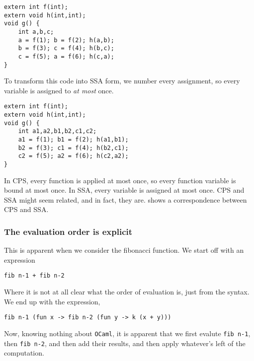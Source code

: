 \begin{code}
\label{code:fib-ocaml-again}
\begin{verbatim}
extern int f(int); 
extern void h(int,int); 
void g() {   
    int a,b,c;   
    a = f(1); b = f(2); h(a,b);   
    b = f(3); c = f(4); h(b,c);   
    c = f(5); a = f(6); h(c,a); 
}
\end{verbatim}
\end{code}

To transform this code into SSA form, we number every assignment, so every variable is assigned to \emph{at most} once. 

\begin{code}
\label{code:fib-ocaml-again}
\begin{verbatim}
extern int f(int); 
extern void h(int,int); 
void g() {   
    int a1,a2,b1,b2,c1,c2;   
    a1 = f(1); b1 = f(2); h(a1,b1);   
    b2 = f(3); c1 = f(4); h(b2,c1);   
    c2 = f(5); a2 = f(6); h(c2,a2); 
}
\end{verbatim}
\end{code}

In CPS, every function is applied at most once, so every function variable is bound at most once. In SSA, every variable is assigned at most once. CPS and SSA might seem related, and in fact, they are. \citet{kelsey-1995} shows a correspondence between CPS and SSA. 

\subsubsection{The evaluation order is explicit}
This is apparent when we consider the fibonacci function. We start off with an expression
\begin{verbatim}
fib n-1 + fib n-2
\end{verbatim}
Where it is not at all clear what the order of evaluation is, just from the syntax. We end up with the expression,
\begin{verbatim}
fib n-1 (fun x -> fib n-2 (fun y -> k (x + y))) 
\end{verbatim}
Now, knowing nothing about \texttt{OCaml}, it is apparent that we first evalute \texttt{fib n-1}, then \texttt{fib n-2}, and then add their results, and then apply whatever's left of the computation. 

